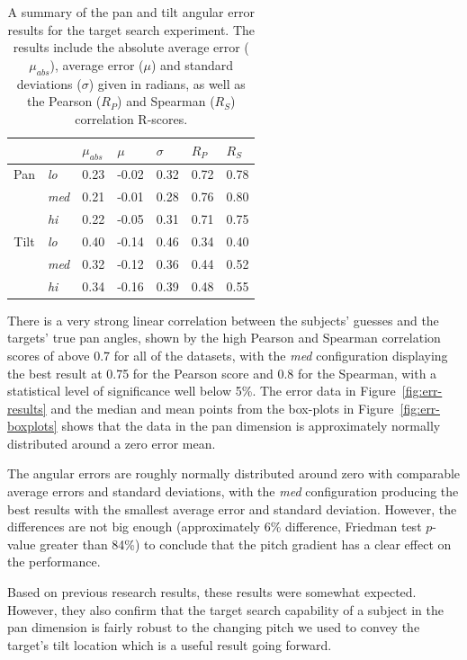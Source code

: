 \documentclass[format=sigconf, review=true, screen=true, anonymous=true]{acmart}
\begin{document}
\begin{table}
  \centering
  \caption{A summary of the pan and tilt angular error results for the target search experiment. The results include the absolute average error ($\mu_{abs}$), average error ($\mu$) and standard deviations ($\sigma$) given in radians, as well as the Pearson ($R_P$) and Spearman ($R_S$) correlation R-scores.}
  \label{tab:results}
  \begin{tabular}{|c|l|l|l|l|l|l|}
    \hline
    & & $\mu_{abs}$ & $\mu$ & $\sigma$ & $R_{P}$ & $R_{S}$ \\\hline\hline
    Pan & \emph{lo}  & 0.23 & -0.02 & 0.32 & 0.72 & 0.78 \\\cline{2-7}
    & \emph{med} & 0.21 & -0.01 & 0.28 & 0.76 & 0.80 \\\cline{2-7}
    & \emph{hi}  & 0.22 & -0.05 & 0.31 & 0.71 & 0.75 \\\hline\hline
    Tilt & \emph{lo}  & 0.40 & -0.14 & 0.46 & 0.34 & 0.40 \\\cline{2-7}
    & \emph{med} & 0.32 & -0.12 & 0.36 & 0.44 & 0.52 \\\cline{2-7}
    & \emph{hi}  & 0.34 & -0.16 & 0.39 & 0.48 & 0.55 \\\hline
  \end{tabular}
\end{table}

There is a very strong linear correlation between the subjects' guesses and the targets' true pan angles, shown by the high Pearson and Spearman correlation scores of above 0.7 for all of the datasets, with the \emph{med} configuration displaying the best result at 0.75 for the Pearson score and 0.8 for the Spearman, with a statistical level of significance well below 5\%. The error data in Figure~\ref{fig:err-results} and the median and mean points from the box-plots in Figure~\ref{fig:err-boxplots} shows that the data in the pan dimension is approximately normally distributed around a zero error mean.  

The angular errors are roughly normally distributed around zero with comparable average errors and standard deviations, with the \emph{med} configuration producing the best results with the smallest average error and standard deviation. However, the differences are not big enough (approximately 6\% difference, Friedman test $p$-value greater than 84\%) to conclude that the pitch gradient has a clear effect on the performance. 

Based on previous research results, these results were somewhat expected. However, they also confirm that the target search capability of a subject in the pan dimension is fairly robust to the changing pitch we used to convey the target's tilt location which is a useful result going forward. %
\end{document}
